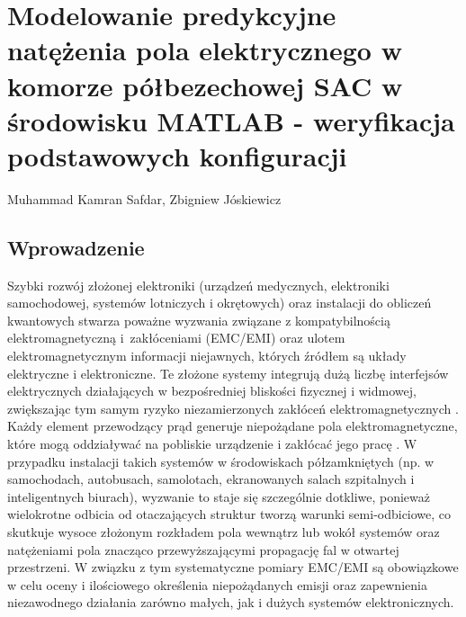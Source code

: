 \chapter[Modelowanie predykcyjne \ldots]{Modelowanie predykcyjne natężenia pola elektrycznego w komorze półbezechowej SAC w środowisku MATLAB  - weryfikacja podstawowych konfiguracji}
\label{modelowanie} %
\thispagestyle{empty}
\vspace{-8mm} {\large Muhammad Kamran Safdar, Zbigniew Jóskiewicz} \vspace{8mm}

\section{Wprowadzenie}
\label{sec:17_wp}
Szybki rozwój złożonej elektroniki (urządzeń medycznych, elektroniki samochodowej, systemów lotniczych i okrętowych) oraz instalacji do obliczeń kwantowych stwarza poważne wyzwania związane z kompatybilnością elektromagnetyczną i~zakłóceniami (EMC/EMI) oraz ulotem elektromagnetycznym informacji niejawnych, których źródłem są układy elektryczne i elektroniczne. Te złożone systemy integrują dużą liczbę interfejsów elektrycznych działających w bezpośredniej bliskości fizycznej i widmowej, zwiększając tym samym ryzyko niezamierzonych zakłóceń elektromagnetycznych \cite{1OTT1}. Każdy element przewodzący prąd generuje niepożądane pola elektromagnetyczne, które mogą oddziaływać na pobliskie urządzenie i zakłócać jego pracę \cite{2DOBREF2,3PAUL3,4KOVAR4}. W przypadku instalacji takich systemów w środowiskach półzamkniętych (np. w samochodach, autobusach, samolotach, ekranowanych salach szpitalnych i inteligentnych biurach), wyzwanie to staje się szczególnie dotkliwe, ponieważ wielokrotne odbicia od otaczających struktur tworzą warunki semi-odbiciowe, co skutkuje wysoce złożonym rozkładem pola wewnątrz lub wokół systemów oraz natężeniami pola znacząco przewyższającymi propagację fal w otwartej przestrzeni. W związku z tym systematyczne pomiary EMC/EMI są obowiązkowe w celu oceny i ilościowego określenia niepożądanych emisji oraz zapewnienia niezawodnego działania zarówno małych, jak i dużych systemów elektronicznych.

